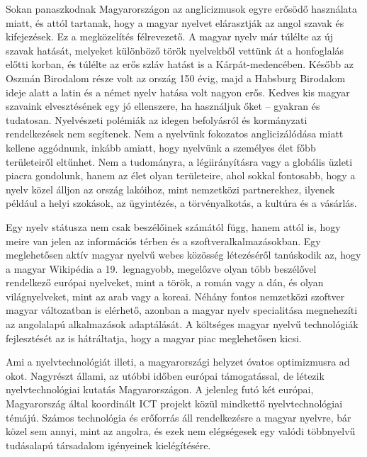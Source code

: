 \begin{multicols}{2}
Sokan panaszkodnak Magyarországon az anglicizmusok egyre erősödő használata miatt, és attól tartanak, hogy a magyar nyelvet elárasztják  az angol szavak és kifejezések. Ez a megközelítés félrevezető. A magyar nyelv már túlélte az új szavak hatását, melyeket különböző török nyelvekből vettünk át a honfoglalás előtti korban, és túlélte az erős szláv hatást is a Kárpát-medencében. Később az Oszmán Birodalom része volt az ország 150 évig, majd a Habsburg Birodalom ideje alatt a latin és a német nyelv hatása volt nagyon erős. Kedves kis magyar szavaink elvesztésének egy jó ellenszere, ha használjuk őket -- gyakran és tudatosan. Nyelvészeti polémiák az idegen befolyásról és kormányzati rendelkezések nem segítenek. Nem a nyelvünk fokozatos anglicizálódása miatt kellene aggódnunk, inkább amiatt, hogy nyelvünk a személyes élet főbb területeiről eltűnhet. Nem a tudományra, a légiirányításra vagy a globális üzleti piacra gondolunk, hanem az élet olyan területeire, ahol sokkal fontosabb, hogy a nyelv közel álljon az ország lakóihoz, mint nemzetközi partnerekhez, ilyenek például a helyi szokások, az ügyintézés, a törvényalkotás, a kultúra és a vásárlás.    

Egy nyelv státusza nem csak beszélőinek számától függ, hanem attól is, hogy meire van jelen az információs térben és a szoftveralkalmazásokban. Egy meglehetősen aktív magyar nyelvű webes közösség létezéséről tanúskodik az, hogy a magyar Wikipédia a 19.~leg\-na\-gyobb, megelőzve olyan több beszélővel rendelkező európai nyelveket, mint a török, a román vagy a dán, és olyan világnyelveket, mint az arab vagy a koreai. Néhány fontos nemzetközi szoftver magyar változatban is elérhető, azonban a magyar nyelv specialitása megnehezíti az angolalapú alkalmazások adaptálását. A költséges magyar nyelvű technológiák fejlesztését az is hátráltatja, hogy a magyar piac meglehetősen kicsi. 

Ami a nyelvtechnológiát illeti, a magyarországi helyzet óvatos optimizmusra ad okot. Nagyrészt állami, az utóbbi időben európai támogatással, de létezik nyelvtechnológiai kutatás Magyarországon. A jelenleg futó két európai, Magyarország által koordinált ICT projekt közül mindkettő nyelvtechnológiai témájú. Számos technológia és erőforrás áll rendelkezésre a magyar nyelvre, bár közel sem annyi, mint az angolra, és ezek nem elégségesek egy valódi többnyelvű tudásalapú társadalom igényeinek kielégítésére.


\end{multicols}
